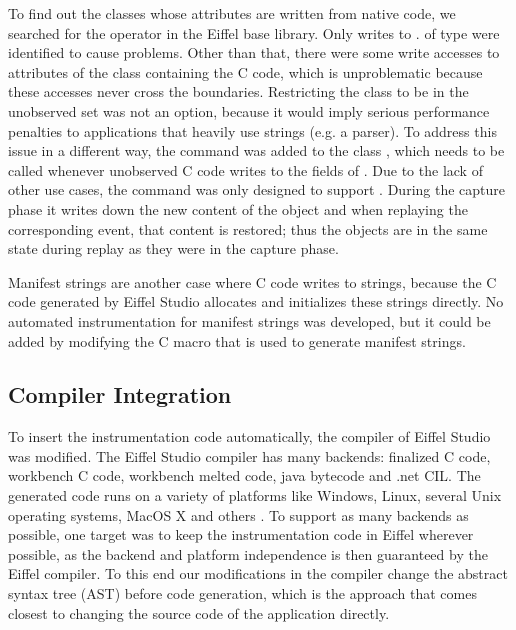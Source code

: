 To find out the classes whose attributes are written from native code, we searched for the \identifier{\$} operator in the Eiffel base library. Only writes to \hspace{0pt}. of type  were identified to cause problems. Other than that, there were some write accesses to attributes of the class containing the C code, which is unproblematic because these accesses never cross the boundaries.
Restricting the class  to be in the unobserved set was not an option, because it would imply serious performance penalties to applications that heavily use strings (e.g. a parser). To address this issue in a different way, the command  was added to the class , which needs to be called whenever unobserved C code writes to the fields of . Due to the lack of other use cases, the command was only designed to support . During the capture phase it writes down the new content of the object and when replaying the corresponding event, that content is restored; thus the objects are in the same state during replay as they were in the capture phase.

Manifest strings are another case where C code writes to strings, because the C code generated by Eiffel Studio allocates and initializes these strings directly. No automated instrumentation for manifest strings was developed, but it could be added by modifying the C macro that is used to generate manifest strings.


\subsection{Compiler Integration}
To insert the instrumentation code automatically, the compiler of Eiffel Studio was modified. The Eiffel Studio compiler has many backends: finalized C code, workbench C code, workbench melted code, java bytecode and .net CIL. The generated code runs on a variety of platforms like Windows, Linux, several Unix operating systems, MacOS X and others \cite{eiffelsoftware}. To support as many backends as possible, one target was to keep the instrumentation code in Eiffel wherever possible, as the backend and platform independence is then guaranteed by the Eiffel compiler. To this end our modifications in the compiler change the abstract syntax tree (AST) before code generation, which is the approach that comes closest to changing the source code of the application directly.

